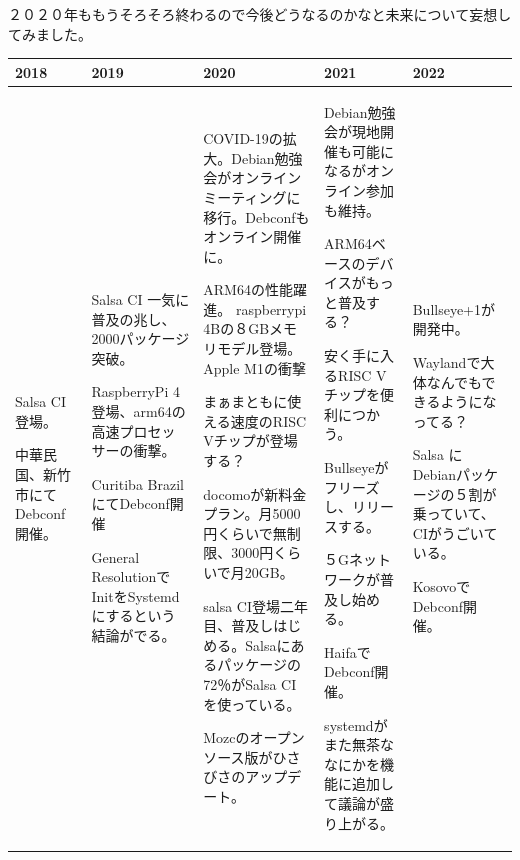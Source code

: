 \documentclass[mingoth,a4paper]{jsarticle}
\begin{document}

２０２０年ももうそろそろ終わるので今後どうなるのかなと未来について妄想してみました。

{\scriptsize

\begin{tabular}[t]{|p{8em}|p{8em}|p{8em}|p{8em}|p{8em}|}
\hline
2018 & 2019 & 2020 & 2021 & 2022 \\
\hline
Salsa CI 登場。

中華民国、新竹市にてDebconf開催。

&

Salsa CI 一気に普及の兆し、2000パッケージ突破。

RaspberryPi 4登場、arm64の高速プロセッサーの衝撃。

Curitiba BrazilにてDebconf開催

General ResolutionでInitをSystemd にするという結論がでる。

&

COVID-19の拡大。Debian勉強会がオンラインミーティングに移行。Debconfもオンライン開催に。

ARM64の性能躍進。
raspberrypi 4Bの８GBメモリモデル登場。
Apple M1の衝撃

まぁまともに使える速度のRISC Vチップが登場する？

docomoが新料金プラン。月5000円くらいで無制限、3000円くらいで月20GB。

salsa CI登場二年目、普及しはじめる。Salsaにあるパッケージの72％がSalsa CIを使っている。

Mozcのオープンソース版がひさびさのアップデート。

&

Debian勉強会が現地開催も可能になるがオンライン参加も維持。

ARM64ベースのデバイスがもっと普及する？

安く手に入るRISC Vチップを便利につかう。

Bullseyeがフリーズし、リリースする。

５Gネットワークが普及し始める。

HaifaでDebconf開催。

systemdがまた無茶ななにかを機能に追加して議論が盛り上がる。

&

Bullseye+1が開発中。

Waylandで大体なんでもできるようになってる？

Salsa にDebianパッケージの５割が乗っていて、CIがうごいている。

KosovoでDebconf開催。

\\

\hline
\end{tabular}
}
\end{document}
